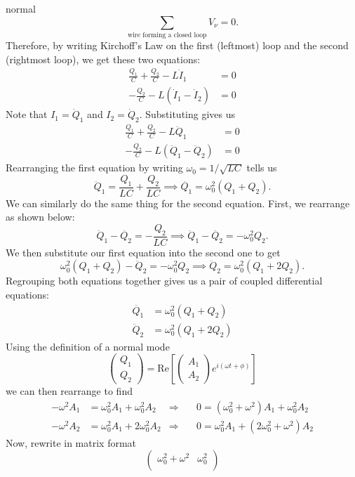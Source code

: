 \begin{solution}{normal}
\[\sum_{\text{wire forming a closed loop}} V_{\nu} = 0.\]
Therefore, by writing Kirchoff's Law on the first (leftmost) loop and the second (rightmost loop), we get these two equations:
\begin{align*}
\frac{Q_1}{C} + \frac{Q_2}{C} - L\dot{I}_1 &= 0 \\
-\frac{Q_2}{C} - L(\dot{I}_1 - \dot{I}_2) &= 0
\end{align*}
Note that $I_1 = \dot{Q}_1$ and $I_2 = \dot{Q}_2$. Substituting gives us 
\begin{align*}
\frac{Q_1}{C} + \frac{Q_2}{C} - L\ddot{Q}_1 &= 0 \\
-\frac{Q_2}{C} - L(\ddot{Q}_1 - \ddot{Q}_2) &= 0
\end{align*}
Rearranging the first equation by writing $\omega_0 = 1/\sqrt{LC}$ tells us 
\[\ddot{Q}_1 = \frac{Q_1}{LC} + \frac{Q_2}{LC}\implies \ddot{Q_1} = \omega_0^2 (Q_1 + Q_2).\]
We can similarly do the same thing for the second equation. First, we rearrange as shown below:
\[\ddot{Q}_1 - \ddot{Q_2} = -\frac{Q_2}{LC}\implies \ddot{Q}_1 - \ddot{Q_2} = -\omega_0^2 Q_2.\]
We then substitute our first equation into the second one to get 
\[ \omega_0^2 (Q_1 + Q_2) - \ddot{Q}_2 = -\omega_0^2 Q_2\implies \ddot{Q}_2 = \omega_0^2 (Q_1 + 2Q_2).\]
Regrouping both equations together gives us a pair of coupled differential equations:
\begin{align*}
\ddot{Q_1} &= \omega_0^2 (Q_1 + Q_2) \\
\ddot{Q}_2 &= \omega_0^2 (Q_1 + 2Q_2)
\end{align*}
Using the definition of a normal mode 
\[
\begin{pmatrix}
Q_1 \\
Q_2 
\end{pmatrix}
= 
\text{Re} \left[
\begin{pmatrix}
A_1 \\
A_2 
\end{pmatrix}
e^{i (\omega t + \phi)}
\right]
\]
we can then rearrange to find
$$\begin{aligned}
- \omega^{2}A_1 &= \omega_0^2 A_1 + \omega_0^2 A_2 & \Rightarrow\quad & 0=\left(\omega_0^2 + \omega^2 \right) A_{1}+ \omega_0^2 A_2 \\
-\omega^{2}A_2 &= \omega_0^2 A_1 + 2\omega_0^2 A_2 & \Rightarrow \quad & 0= \omega_0^2 A_1 + (2\omega_0^2 + \omega^2)A_2  
\end{aligned}$$
Now, rewrite in matrix format
\[
\begin{pmatrix}
\omega_0^2 + \omega^2 & \omega_0^2 \\

\end{pmatrix}\]
\end{solution}
